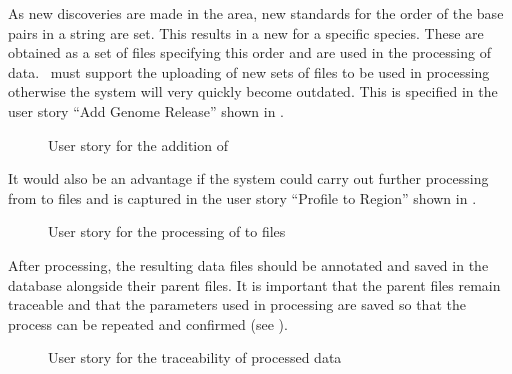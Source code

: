 As new discoveries are made in the area, new standards for the order of the base pairs in a  string are set. This results in a new  for a specific species. These are obtained as a set of files specifying this order and are used in the processing of  data. \appName\ must support the uploading of new sets of  files to be used in processing otherwise the system will very quickly become outdated. This is specified in the user story ``Add Genome Release'' shown in .

\begin{figure}[h!]
\caption{User story for the addition of }
\label{fig:target_GR}
\end{figure}

It would also be an advantage if the system could carry out further processing from  to  files and is captured in the user story ``Profile to Region'' shown in .

\begin{figure}[h!]
\caption{User story for the processing of  to  files}
\label{fig:target_profReg}
\end{figure}

After processing, the resulting data files should be annotated and saved in the database alongside their parent files. It is important that the parent files remain traceable and that the parameters used in processing are saved so that the process can be repeated and confirmed (see ).

\begin{figure}[h!]
\caption{User story for the traceability of processed data}
\label{fig:target_trace}
\end{figure}

